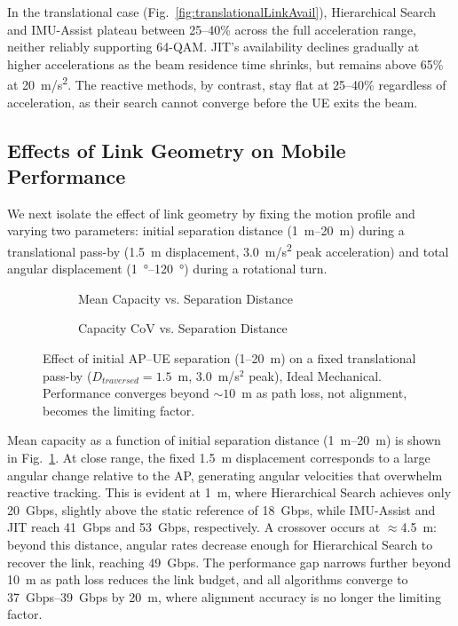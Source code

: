 \documentclass[fleqn,10pt]{wlscirep}
\begin{document}
In the translational case (Fig.~\ref{fig:translationalLinkAvail}), Hierarchical Search and IMU-Assist plateau between 25--40\% across the full acceleration range, neither reliably supporting 64-QAM. JIT's availability declines gradually at higher accelerations as the beam residence time shrinks, but remains above 65\% at \SI{20}{m/s^2}. The reactive methods, by contrast, stay flat at 25--40\% regardless of acceleration, as their search cannot converge before the UE exits the beam.



\subsection*{Effects of Link Geometry on Mobile Performance}

We next isolate the effect of link geometry by fixing the motion profile and varying two parameters: initial separation distance (\SIrange{1}{20}{m}) during a translational pass-by (\SI{1.5}{m} displacement, \SI{3.0}{m/s^2} peak acceleration) and total angular displacement (\SIrange{1}{120}{\degree}) during a rotational turn.

\begin{figure}[h!]
    \centering
    \begin{subfigure}{0.495\linewidth}
        
        \vspace{-25pt}
        \caption{Mean Capacity vs. Separation Distance}
        \label{fig:dist_rate}
    \end{subfigure}
    \hfill
    \begin{subfigure}{0.495\linewidth}
        
        \vspace{-25pt}
        \caption{Capacity CoV vs. Separation Distance}
        \label{fig:dist_cov}
    \end{subfigure}
    \caption{Effect of initial AP--UE separation (1--20~m) on a fixed translational pass-by ($D_{traversed} = 1.5$~m, $3.0$~m/s$^2$ peak), Ideal Mechanical. Performance converges beyond ${\sim}10$~m as path loss, not alignment, becomes the limiting factor.}
    \vspace{-5pt}
\end{figure}

Mean capacity as a function of initial separation distance (\SIrange{1}{20}{m}) is shown in Fig.~\ref{fig:dist_rate}. At close range, the fixed \SI{1.5}{m} displacement corresponds to a large angular change relative to the AP, generating angular velocities that overwhelm reactive tracking. This is evident at \SI{1}{m}, where Hierarchical Search achieves only \SI{20}{Gbps}, slightly above the static reference of \SI{18}{Gbps}, while IMU-Assist and JIT reach \SI{41}{Gbps} and \SI{53}{Gbps}, respectively. A crossover occurs at $\approx$\SI{4.5}{m}: beyond this distance, angular rates decrease enough for Hierarchical Search to recover the link, reaching \SI{49}{Gbps}. The performance gap narrows further beyond \SI{10}{m} as path loss reduces the link budget, and all algorithms converge to \SIrange{37}{39}{Gbps} by \SI{20}{m}, where alignment accuracy is no longer the limiting factor.
\end{document}
